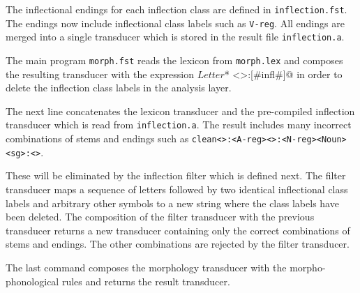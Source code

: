 \documentclass[11pt]{article}
\begin{document}
The inflectional endings for each inflection class are defined in
\texttt{inflection.fst}. The endings now include inflectional class
labels such as \texttt{V-reg}. All endings are merged into a single
transducer which is stored in the result file \texttt{inflection.a}.

The main program \texttt{morph.fst} reads the lexicon from
\texttt{morph.lex} and composes the resulting transducer with the
expression \verb@$Letter$* <>:[#infl#]@ in order to delete the
inflection class labels in the analysis layer. 

The next line concatenates the lexicon transducer and the pre-compiled
inflection transducer which is read from \texttt{inflection.a}. The
result includes many incorrect combinations of stems and endings such
as \texttt{clean<>:<A-reg><>:<N-reg><Noun><sg>:<>}. 

These will be eliminated by the inflection filter which is defined
next. The filter transducer maps a sequence of letters followed by two
identical inflectional class labels and arbitrary other symbols to a
new string where the class labels have been deleted. The composition
of the filter transducer with the previous transducer returns a new
transducer containing only the correct combinations of stems and
endings. The other combinations are rejected by the filter transducer.

The last command composes the morphology transducer with the
morpho-phonological rules and returns the result transducer.
\end{document}
